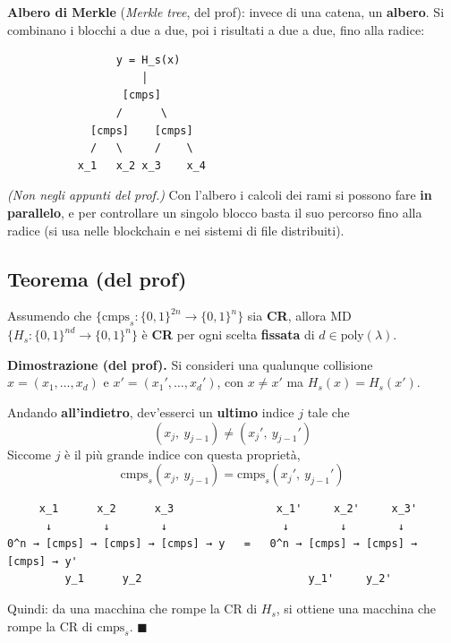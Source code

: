 \textbf{Albero di Merkle} (\emph{Merkle tree}, del prof): invece di una catena, un \textbf{albero}. Si combinano i blocchi a due a due, poi i risultati a due a due, fino alla radice:

\begin{verbatim}
                 y = H_s(x)
                     │
                  [cmps]
                 /      \
             [cmps]    [cmps]
             /   \     /    \
           x_1   x_2 x_3    x_4
\end{verbatim}

\emph{(Non negli appunti del prof.)} Con l'albero i calcoli dei rami si possono fare \textbf{in parallelo}, e per controllare un singolo blocco basta il suo percorso fino alla radice (si usa nelle blockchain e nei sistemi di file distribuiti).

\subsection{Teorema (del prof)}

Assumendo che \(\{\text{cmps}_s : \{0,1\}^{2n} \to \{0,1\}^n\}\) sia \textbf{CR}, allora MD \(\{H_s : \{0,1\}^{nd} \to \{0,1\}^n\}\) è \textbf{CR} per ogni scelta \textbf{fissata} di \(d \in \text{poly}(\lambda)\).

\textbf{Dimostrazione (del prof).} Si consideri una qualunque collisione \(x = (x_1, \dots, x_d)\) e \(x' = (x_1', \dots, x_d')\), con \(x \ne x'\) ma \(H_s(x) = H_s(x')\).

Andando \textbf{all'indietro}, dev'esserci un \textbf{ultimo} indice \(j\) tale che
\[
(x_j,\ y_{j-1}) \ne (x_j',\ y_{j-1}')
\]
Siccome \(j\) è il più grande indice con questa proprietà,
\[
\text{cmps}_s(x_j,\ y_{j-1}) = \text{cmps}_s(x_j',\ y_{j-1}')
\]

\begin{verbatim}
     x_1      x_2      x_3                x_1'     x_2'     x_3'
      ↓        ↓        ↓                  ↓        ↓        ↓
0^n → [cmps] → [cmps] → [cmps] → y   =   0^n → [cmps] → [cmps] → [cmps] → y'
         y_1      y_2                          y_1'     y_2'
\end{verbatim}

Quindi: da una macchina che rompe la CR di \(H_s\), si ottiene una macchina che rompe la CR di \(\text{cmps}_s\). \(\blacksquare\)

